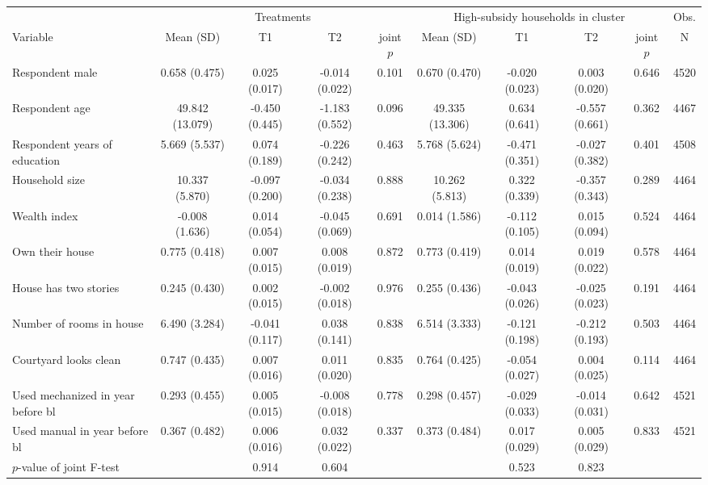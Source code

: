 \begin{tabular}{lccccccccc}
\hline\hline
 & \multicolumn{4}{c}{Treatments} & \multicolumn{4}{c}{High-subsidy households in cluster} & Obs. \\
Variable & Mean (SD) & T1 & T2 & joint $p$ & Mean (SD) & T1 & T2 & joint $p$ & N \\
\hline
Respondent male & 0.658 (0.475) & 0.025 (0.017) & -0.014 (0.022) & 0.101 & 0.670 (0.470) & -0.020 (0.023) & 0.003 (0.020) & 0.646 & 4520 \\
Respondent age & 49.842 (13.079) & -0.450 (0.445) & -1.183 (0.552) & 0.096 & 49.335 (13.306) & 0.634 (0.641) & -0.557 (0.661) & 0.362 & 4467 \\
Respondent years of education & 5.669 (5.537) & 0.074 (0.189) & -0.226 (0.242) & 0.463 & 5.768 (5.624) & -0.471 (0.351) & -0.027 (0.382) & 0.401 & 4508 \\
Household size & 10.337 (5.870) & -0.097 (0.200) & -0.034 (0.238) & 0.888 & 10.262 (5.813) & 0.322 (0.339) & -0.357 (0.343) & 0.289 & 4464 \\
Wealth index & -0.008 (1.636) & 0.014 (0.054) & -0.045 (0.069) & 0.691 & 0.014 (1.586) & -0.112 (0.105) & 0.015 (0.094) & 0.524 & 4464 \\
Own their house & 0.775 (0.418) & 0.007 (0.015) & 0.008 (0.019) & 0.872 & 0.773 (0.419) & 0.014 (0.019) & 0.019 (0.022) & 0.578 & 4464 \\
House has two stories & 0.245 (0.430) & 0.002 (0.015) & -0.002 (0.018) & 0.976 & 0.255 (0.436) & -0.043 (0.026) & -0.025 (0.023) & 0.191 & 4464 \\
Number of rooms in house & 6.490 (3.284) & -0.041 (0.117) & 0.038 (0.141) & 0.838 & 6.514 (3.333) & -0.121 (0.198) & -0.212 (0.193) & 0.503 & 4464 \\
Courtyard looks clean & 0.747 (0.435) & 0.007 (0.016) & 0.011 (0.020) & 0.835 & 0.764 (0.425) & -0.054 (0.027) & 0.004 (0.025) & 0.114 & 4464 \\
Used mechanized in year before bl & 0.293 (0.455) & 0.005 (0.015) & -0.008 (0.018) & 0.778 & 0.298 (0.457) & -0.029 (0.033) & -0.014 (0.031) & 0.642 & 4521 \\
Used manual in year before bl & 0.367 (0.482) & 0.006 (0.016) & 0.032 (0.022) & 0.337 & 0.373 (0.484) & 0.017 (0.029) & 0.005 (0.029) & 0.833 & 4521 \\
$p$-value of joint F-test &  & 0.914 & 0.604 &  &  & 0.523 & 0.823 &  &  \\
\hline\hline
\end{tabular}
